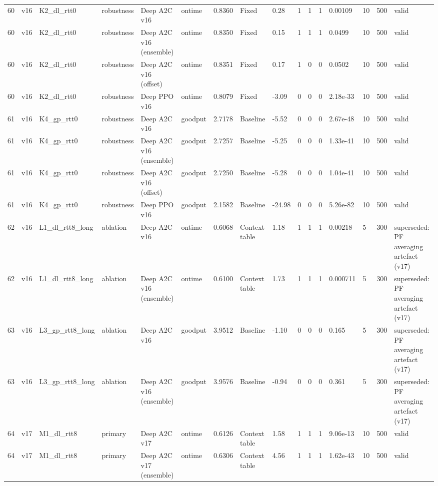 \documentclass[10pt]{article}
\begin{document}
\begin{landscape}
\begin{longtable}{@{}llllllllllllllll@{}}
60 & v16 & K2\_dl\_rtt0 & robustness & Deep A2C v16 & ontime & 0.8360 & Fixed & 0.28 & 1 & 1 & 1 & 0.00109 & 10 & 500 & valid \\
60 & v16 & K2\_dl\_rtt0 & robustness & Deep A2C v16 (ensemble) & ontime & 0.8350 & Fixed & 0.15 & 1 & 1 & 1 & 0.0499 & 10 & 500 & valid \\
60 & v16 & K2\_dl\_rtt0 & robustness & Deep A2C v16 (offset) & ontime & 0.8351 & Fixed & 0.17 & 1 & 0 & 0 & 0.0502 & 10 & 500 & valid \\
60 & v16 & K2\_dl\_rtt0 & robustness & Deep PPO v16 & ontime & 0.8079 & Fixed & -3.09 & 0 & 0 & 0 & 2.18e-33 & 10 & 500 & valid \\
61 & v16 & K4\_gp\_rtt0 & robustness & Deep A2C v16 & goodput & 2.7178 & Baseline & -5.52 & 0 & 0 & 0 & 2.67e-48 & 10 & 500 & valid \\
61 & v16 & K4\_gp\_rtt0 & robustness & Deep A2C v16 (ensemble) & goodput & 2.7257 & Baseline & -5.25 & 0 & 0 & 0 & 1.33e-41 & 10 & 500 & valid \\
61 & v16 & K4\_gp\_rtt0 & robustness & Deep A2C v16 (offset) & goodput & 2.7250 & Baseline & -5.28 & 0 & 0 & 0 & 1.04e-41 & 10 & 500 & valid \\
61 & v16 & K4\_gp\_rtt0 & robustness & Deep PPO v16 & goodput & 2.1582 & Baseline & -24.98 & 0 & 0 & 0 & 5.26e-82 & 10 & 500 & valid \\
62 & v16 & L1\_dl\_rtt8\_long & ablation & Deep A2C v16 & ontime & 0.6068 & Context table & 1.18 & 1 & 1 & 1 & 0.00218 & 5 & 300 & superseded: PF averaging artefact (v17) \\
62 & v16 & L1\_dl\_rtt8\_long & ablation & Deep A2C v16 (ensemble) & ontime & 0.6100 & Context table & 1.73 & 1 & 1 & 1 & 0.000711 & 5 & 300 & superseded: PF averaging artefact (v17) \\
63 & v16 & L3\_gp\_rtt8\_long & ablation & Deep A2C v16 & goodput & 3.9512 & Baseline & -1.10 & 0 & 0 & 0 & 0.165 & 5 & 300 & superseded: PF averaging artefact (v17) \\
63 & v16 & L3\_gp\_rtt8\_long & ablation & Deep A2C v16 (ensemble) & goodput & 3.9576 & Baseline & -0.94 & 0 & 0 & 0 & 0.361 & 5 & 300 & superseded: PF averaging artefact (v17) \\
64 & v17 & M1\_dl\_rtt8 & primary & Deep A2C v17 & ontime & 0.6126 & Context table & 1.58 & 1 & 1 & 1 & 9.06e-13 & 10 & 500 & valid \\
64 & v17 & M1\_dl\_rtt8 & primary & Deep A2C v17 (ensemble) & ontime & 0.6306 & Context table & 4.56 & 1 & 1 & 1 & 1.62e-43 & 10 & 500 & valid \\

\end{longtable}
\end{landscape}
\end{document}
